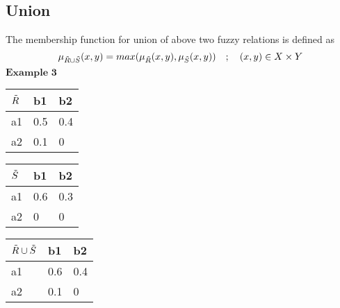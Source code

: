 \documentclass{article}
\begin{document}
\subsection{Union}
The membership function for union of above two fuzzy relations is defined as
\begin{equation}
\mu_{\Tilde{R}\cup\Tilde{S}}(x,y)=max(\mu_{\Tilde{R}}(x,y),\mu_{\Tilde{S}}(x,y))\quad  ;\quad (x,y)\in {X}\times{Y} 
\end{equation}
$\textbf{Example 3}$\newline
\begin{center}
\def\arraystretch{1.4}%
\begin{tabular}{ | m{1cm} | m{1cm}| m{1cm} | } 
  \hline
  $\Tilde{R}$& b1 & b2 \\ 
  \hline
  a1  & 0.5 & 0.4 \\ 
  \hline
  a2 & 0.1 & 0 \\ 
  \hline
\end{tabular}
\quad
\def\arraystretch{1.4}%
\begin{tabular}{ | m{1cm} | m{1cm}| m{1cm} | } 
  \hline
  $\Tilde{S}$& b1 & b2 \\ 
  \hline
  a1  & 0.6 & 0.3 \\ 
  \hline
  a2 & 0 & 0 \\ 
  \hline
\end{tabular}
\end{center}
\begin{center}
\def\arraystretch{1.4}%
\begin{tabular}{ | m{1cm} | m{1cm}| m{1cm} | } 
  \hline
  $\Tilde{R}\cup\Tilde{S}$& b1 & b2 \\ 
  \hline
  a1  & 0.6 & 0.4 \\ 
  \hline
  a2 & 0.1 & 0 \\ 
  \hline
\end{tabular}
\end{center}
\end{document}
